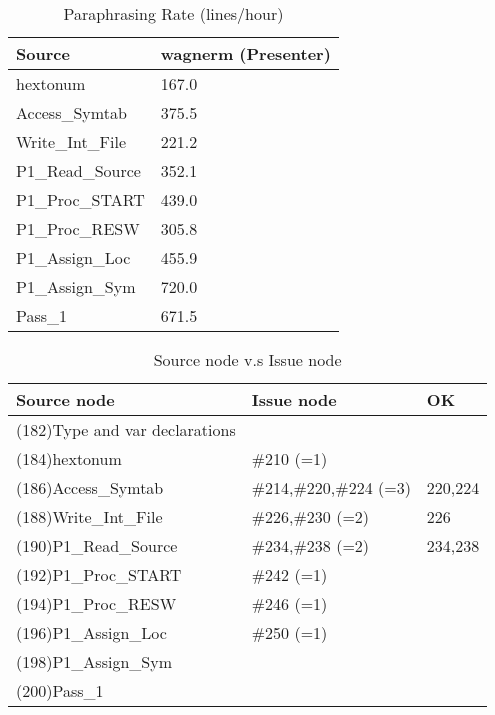 \begin{table}[hb]
\begin{center}
\begin{tabular}{|l|l|}
\hline
Source & wagnerm (Presenter)\\
\hline
hextonum & 167.0\\
Access\_Symtab & 375.5\\
Write\_Int\_File & 221.2\\
P1\_Read\_Source & 352.1\\
P1\_Proc\_START & 439.0\\
P1\_Proc\_RESW & 305.8\\
P1\_Assign\_Loc & 455.9\\
P1\_Assign\_Sym & 720.0\\
Pass\_1 & 671.5\\
\hline
\end{tabular}
\end{center}
\caption{Paraphrasing Rate (lines/hour)}
\end{table}



\begin{table}[hb]
\begin{center}
\begin{tabular}{|l|l|l|}
\hline
Source node & Issue node  & OK\\
\hline
(182)Type and var declarations &  & \\
(184)hextonum & \#210 (=1) & \\
(186)Access\_Symtab & \#214,\#220,\#224 (=3) & 220,224\\
(188)Write\_Int\_File & \#226,\#230 (=2) & 226\\
(190)P1\_Read\_Source & \#234,\#238 (=2) & 234,238\\
(192)P1\_Proc\_START & \#242 (=1) & \\
(194)P1\_Proc\_RESW & \#246 (=1) & \\
(196)P1\_Assign\_Loc & \#250 (=1) & \\
(198)P1\_Assign\_Sym &  & \\
(200)Pass\_1 &  & \\
\hline
\end{tabular}
\caption{Source node v.s Issue node}
\end{center}
\end{table}

